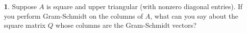 \documentclass{article}
\theoremstyle{definition}
\newtheorem{prob}{}
\begin{document}
%	
%
%
%

\begin{prob}
	Suppose $A$ is square and upper triangular (with nonzero diagonal entries). If you perform Gram-Schmidt on the columns of $A$, what can you say about the square matrix $Q$ whose columns are the Gram-Schmidt vectors?
\end{prob}

\end{document}
